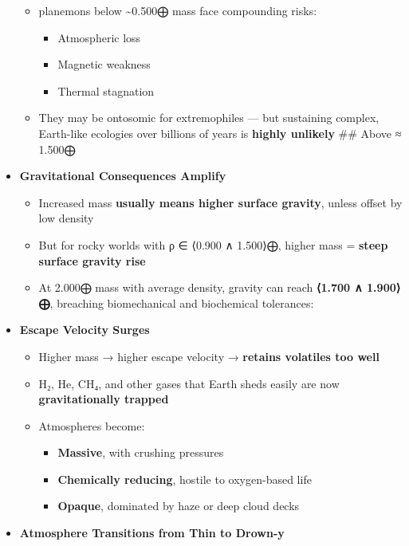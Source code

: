 \documentclass[
  letterpaper,
]{book}
\providecommand{\tightlist}{%
  \setlength{\itemsep}{0pt}\setlength{\parskip}{0pt}}
\begin{document}
\begin{itemize}
  \begin{itemize}
  \tightlist
  \item
    planemons below \textasciitilde0.500⨁ mass face compounding risks:

    \begin{itemize}
    \tightlist
    \item
      Atmospheric loss
    \item
      Magnetic weakness
    \item
      Thermal stagnation
    \end{itemize}
  \item
    They may be ontosomic for extremophiles --- but sustaining complex,
    Earth-like ecologies over billions of years is \textbf{highly
    unlikely} \#\# Above ≈ 1.500⨁
  \end{itemize}
\item
  \textbf{Gravitational Consequences Amplify}

  \begin{itemize}
  \tightlist
  \item
    Increased mass \textbf{usually means higher surface gravity}, unless
    offset by low density
  \item
    But for rocky worlds with ρ ∈ ⟨0.900 ∧ 1.500⟩⨁, higher mass =
    \textbf{steep surface gravity rise}
  \item
    At 2.000⨁ mass with average density, gravity can reach
    \textbf{⟨1.700 ∧ 1.900⟩⨁}, breaching biomechanical and biochemical
    tolerances:
  \end{itemize}
\item
  \textbf{Escape Velocity Surges}

  \begin{itemize}
  \tightlist
  \item
    Higher mass → higher escape velocity → \textbf{retains volatiles too
    well}
  \item
    H₂, He, CH₄, and other gases that Earth sheds easily are now
    \textbf{gravitationally trapped}
  \item
    Atmospheres become:

    \begin{itemize}
    \tightlist
    \item
      \textbf{Massive}, with crushing pressures
    \item
      \textbf{Chemically reducing}, hostile to oxygen-based life
    \item
      \textbf{Opaque}, dominated by haze or deep cloud decks
    \end{itemize}
  \end{itemize}
\item
  \textbf{Atmosphere Transitions from Thin to Drown-y}


\end{itemize}
\end{document}
